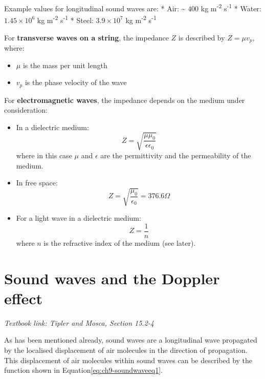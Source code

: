 \documentclass[
]{book}
\providecommand{\tightlist}{%
  \setlength{\itemsep}{0pt}\setlength{\parskip}{0pt}}
\begin{document}
Example values for longitudinal sound waves are:
* Air: \textasciitilde{} \(400\) kg m\textsuperscript{-2} s\textsuperscript{-1}
* Water: \(1.45 \times 10^6\) kg m\textsuperscript{-2} s\textsuperscript{-1}
* Steel: \(3.9 \times 10^7\) kg m\textsuperscript{-2} s\textsuperscript{-1}

For \textbf{transverse waves on a string}, the impedance \(Z\) is described by \(Z = \mu v_p\), where:

\begin{itemize}
\tightlist
\item
  \(\mu\) is the mass per unit length
\item
  \(v_p\) is the phase velocity of the wave
\end{itemize}

For \textbf{electromagnetic waves}, the impedance depends on the medium under consideration:

\begin{itemize}
\item
  In a dielectric medium:
  \begin{equation}
  Z = \sqrt{\frac{\mu \mu_0}{\epsilon \epsilon_0}}
  \end{equation}
  where in this case \(\mu\) and \(\epsilon\) are the permittivity and the permeability of the medium.
\item
  In free space:
  \begin{equation}
  Z = \sqrt{\frac{ \mu_0}{ \epsilon_0}} = 376.6 \Omega
  \end{equation}
\item
  For a light wave in a dielectric medium:
  \begin{equation}
  Z = \frac{1}{n}
  \end{equation}
  where \(n\) is the refractive index of the medium (see later).
\end{itemize}

\hypertarget{sec:ch9-sounddoppler}{%
\chapter{Sound waves and the Doppler effect}\label{sec:ch9-sounddoppler}}

\emph{Textbook link: Tipler and Mosca, Section 15.2-4}

As has been mentioned already, sound waves are a longitudinal wave propagated by the localised displacement of air molecules in the direction of propagation. This displacement of air molecules within sound waves can be described by the function shown in Equation\eqref{eq:ch9-soundwaveeq1}.
\end{document}
